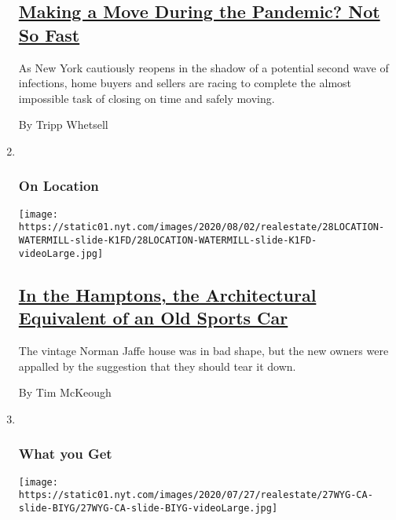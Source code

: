 \begin{enumerate}
{  \subsection{\texorpdfstring{\href{/2020/07/28/realestate/buying-selling-moving-during-coronavirus.html}{Making
  a Move During the Pandemic? Not So
  Fast}}{Making a Move During the Pandemic? Not So Fast}}\label{making-a-move-during-the-pandemic-not-so-fast}}

  As New York cautiously reopens in the shadow of a potential second
  wave of infections, home buyers and sellers are racing to complete the
  almost impossible task of closing on time and safely moving.

  By Tripp Whetsell
\item ~
  \hypertarget{on-location}{%
  \subsubsection{On Location}\label{on-location}}

  \texttt{[image: https://static01.nyt.com/images/2020/08/02/realestate/28LOCATION-WATERMILL-slide-K1FD/28LOCATION-WATERMILL-slide-K1FD-videoLarge.jpg]}

  \hypertarget{in-the-hamptons-the-architectural-equivalent-of-an-old-sports-car}{%
  \subsection{\texorpdfstring{\href{/2020/07/28/realestate/in-the-hamptons-the-architectural-equivalent-of-an-old-sports-car.html}{In
  the Hamptons, the Architectural Equivalent of an Old Sports
  Car}}{In the Hamptons, the Architectural Equivalent of an Old Sports Car}}\label{in-the-hamptons-the-architectural-equivalent-of-an-old-sports-car}}

  The vintage Norman Jaffe house was in bad shape, but the new owners
  were appalled by the suggestion that they should tear it down.

  By Tim McKeough
\item ~
  \hypertarget{what-you-get-1}{%
  \subsubsection{What you Get}\label{what-you-get-1}}

  \texttt{[image: https://static01.nyt.com/images/2020/07/27/realestate/27WYG-CA-slide-BIYG/27WYG-CA-slide-BIYG-videoLarge.jpg]}

  \hypertarget{900000-homes-in-california}{%
}
\end{enumerate}
